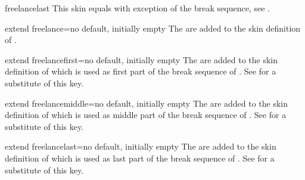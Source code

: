 \begin{docSkin}{freelancelast}
  This skin equals  with exception of the break sequence,
  see .
\end{docSkin}


\begin{docTcbKey}{extend freelance}{=}{no default, initially empty}
The  are added to the skin definition of .
\end{docTcbKey}

\begin{docTcbKey}{extend freelancefirst}{=}{no default, initially empty}
The  are added to the skin definition of  which
is used as first part of the break sequence of .
See  for a substitute of this key.
\end{docTcbKey}

\begin{docTcbKey}{extend freelancemiddle}{=}{no default, initially empty}
The  are added to the skin definition of  which
is used as middle part of the break sequence of .
See  for a substitute of this key.
\end{docTcbKey}

\enlargethispage*{1cm}

\begin{docTcbKey}{extend freelancelast}{=}{no default, initially empty}
The  are added to the skin definition of  which
is used as last part of the break sequence of .
See  for a substitute of this key.
\end{docTcbKey}



